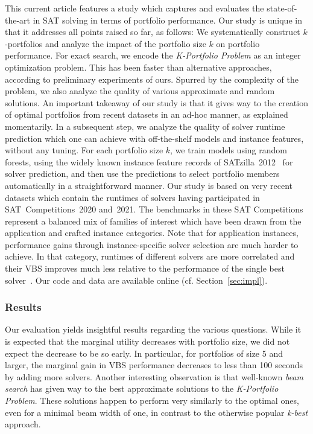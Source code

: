 \documentclass[conference]{IEEEtran}
\begin{document}
This current article features a study which captures and evaluates the state-of-the-art in SAT solving in terms of portfolio performance. 
Our study is unique in that it addresses all points raised so far, as follows:
We systematically construct $k$-portfolios and analyze the impact of the portfolio size $k$ on portfolio performance. 
For exact search, we encode the \emph{K-Portfolio Problem} as an integer optimization problem. 
This has been faster than alternative approaches, according to preliminary experiments of ours. 
Spurred by the complexity of the problem, we also analyze the quality of various approximate and random solutions. 
An important takeaway of our study is that it gives way to the creation of optimal portfolios from recent datasets in an ad-hoc manner, as explained momentarily. 
In a subsequent step, we analyze the quality of solver runtime prediction which one can achieve with off-the-shelf models and instance features, without any tuning.
For each portfolio size $k$, we train models using random forests, using the widely known instance feature records of SATzilla~2012~\cite{xu2012satzilla2012} for solver prediction, and then use the predictions to select portfolio members automatically in a straightforward manner. 
Our study is based on very recent datasets which contain the runtimes of solvers having participated in SAT~Competitions~2020 and~2021. 
The benchmarks in these SAT Competitions represent a balanced mix of families of interest which have been drawn from the application and crafted instance categories. 
Note that for application instances, performance gains through instance-specific solver selection are much harder to achieve. 
In that category, runtimes of different solvers are more correlated and their VBS improves much less relative to the performance of the single best solver~\cite{Collautti:2013:SNNAP}. 
Our code and data are available online (cf. Section~\ref{sec:impl}).


\subsubsection{Results}

Our evaluation yields insightful results regarding the various questions. 
While it is expected that the marginal utility decreases with portfolio size, we did not expect the decrease to be so early. 
In particular, for portfolios of size 5 and larger, the marginal gain in VBS performance decreases to less than 100 seconds by adding more solvers.  
Another interesting observation is that well-known \emph{beam search} has given way to the best approximate solutions to the \emph{K-Portfolio Problem}. 
These solutions happen to perform very similarly to the optimal ones, even for a minimal beam width of one, in contrast to the otherwise popular \emph{k-best} approach. 
\end{document}
